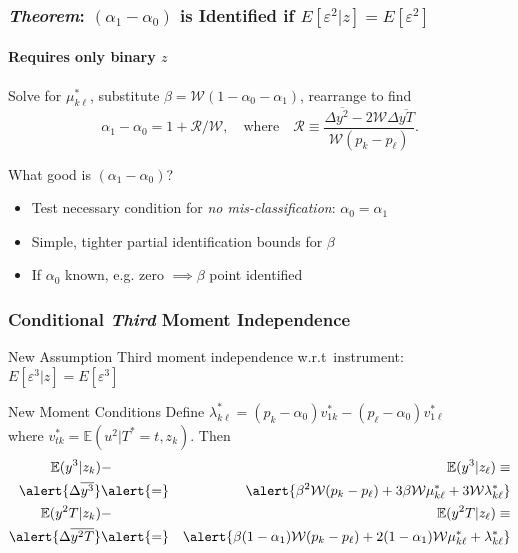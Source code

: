 \documentclass{beamer}
\begin{document}
\begin{frame}
  \frametitle{\emph{Theorem}: $(\alpha_1 - \alpha_0)$ is Identified if $E[\varepsilon^2|z] = E[\varepsilon^2]$}
  \framesubtitle{Requires only binary $z$}

    Solve for $\mu_{k\ell}^*$, substitute $\beta = \mathcal{W} (1 - \alpha_0 - \alpha_1)$, rearrange to find
  \begin{equation*}
    \alpha_1 - \alpha_0 = 1 + \mathcal{R}/\mathcal{W}, \quad \mbox{where} \quad
    \mathcal{R} \equiv \frac{\Delta\overline{y^2} - 2 \mathcal{W}\Delta\overline{yT}}{\mathcal{W}(p_k - p_\ell)}.
  \end{equation*}

  \begin{block}{What good is $\left( \alpha_1 - \alpha_0 \right)$?}
    \begin{itemize}
      \item Test necessary condition for \emph{no mis-classification}: $\alpha_0 = \alpha_1$ 
      \item Simple, tighter partial identification bounds for $\beta$
      \item If $\alpha_0$ known, e.g. zero $\implies \beta$ point identified 
    \end{itemize}
  \end{block}

\end{frame}
\begin{frame}
  \frametitle{Conditional \emph{Third} Moment Independence}
  \begin{block}{New Assumption}
    Third moment independence w.r.t\ instrument: $E[\varepsilon^3|z]=E[\varepsilon^3]$
  \end{block}
  \begin{alertblock}{New Moment Conditions}
    Define $\lambda_{k\ell}^* = (p_k - \alpha_0) v_{1k}^* - (p_\ell - \alpha_0) v_{1\ell}^*$\\ where 
  $v^*_{tk} =  \mathbb{E}(u^2|T^*=t, z_k)$. Then
  \begin{eqnarray*}
    \mathbb{E}(y^3|z_k) &-& \mathbb{E}(y^3|z_\ell)  \equiv \\ \alert{\Delta\overline{y^3}} &\alert{=}& \alert{\beta^2 \mathcal{W} (p_k - p_\ell)  + 3 \beta \mathcal{W} \mu_{k\ell}^* + 3 \mathcal{W} \lambda^*_{k\ell}}\\
    \mathbb{E}(y^2T|z_k) &-& \mathbb{E}(y^2T|z_\ell) \equiv \\ \alert{\Delta\overline{y^2T}} &\alert{=}&  \alert{\beta(1-\alpha_1)\mathcal{W}(p_k - p_\ell) + 2(1-\alpha_1)\mathcal{W}\mu_{k\ell}^* + \lambda_{k\ell}^*}
  \end{eqnarray*}
  \end{alertblock}
\end{frame}
\end{document}
